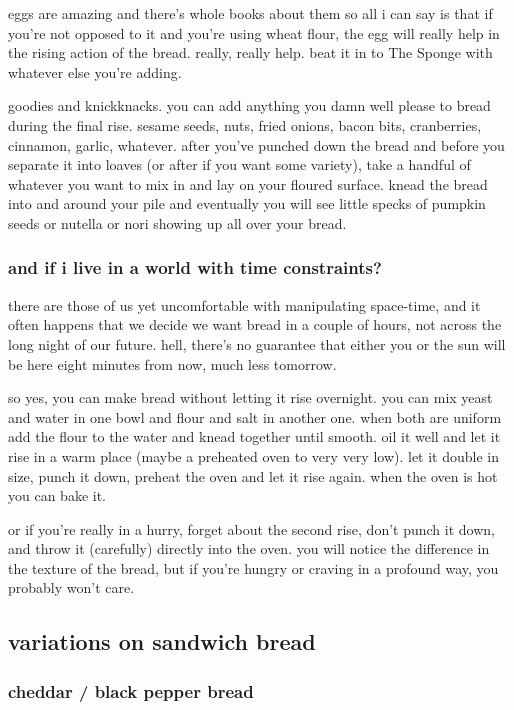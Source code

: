 eggs are amazing and there's whole books about them so all i can
say is that if you're not opposed to it and you're using wheat
flour, the egg will really help in the rising action of the
bread. really, really help. beat it in to The Sponge with whatever
else you're adding.

goodies and knickknacks. you can add anything you damn well please to
bread during the final rise. sesame seeds, nuts, fried onions, bacon
bits, cranberries, cinnamon, garlic, whatever. after you've punched
down the bread and before you separate it into loaves (or after if you
want some variety), take a handful of whatever you want to mix in and
lay on your floured surface. knead the bread into and around your pile
and eventually you will see little specks of pumpkin seeds or nutella
or nori showing up all over your bread.

\subsubsection{and if i live in a world with time constraints?}

there are those of us yet uncomfortable with manipulating space-time,
and it often happens that we decide we want bread in a couple of
hours, not across the long night of our future. hell, there's no
guarantee that either you or the sun will be here eight minutes from
now, much less tomorrow.

so yes, you can make bread without letting it rise overnight. you can
mix yeast and water in one bowl and flour and salt in another
one. when both are uniform add the flour to the water and knead
together until smooth. oil it well and let it rise in a warm place
(maybe a preheated oven to very very low). let it double in size,
punch it down, preheat the oven and let it rise again. when the oven
is hot you can bake it.

or if you're really in a hurry, forget about the second rise,
don't punch it down, and throw it (carefully) directly into the
oven. you will notice the difference in the texture of the bread, but
if you're hungry or craving in a profound way, you probably
won't care.

\subsection{variations on sandwich bread}

\subsubsection{cheddar / black pepper bread}

